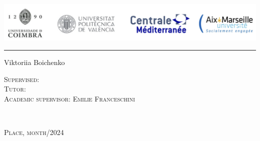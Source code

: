 \documentclass[11pt]{report}
\begin{document}

\thispagestyle{empty}
\begin{minipage}{0.96\linewidth}
\includegraphics[width=\linewidth]{figures/universities.png}
\end{minipage}
\vspace{20pt}
\hrule
\vspace{5pt}

\begin{center}
\vfill
{

\LARGE{}

\vspace{0.5cm}
\Large
{}}   


\vfill
 
\Large{Viktoriia Boichenko}
 
\vfill

\LARGE{}

\LARGE{}

\Large
{}

\end{center}

\vfill

\begin{minipage}[t]{0.5\linewidth}
    \textsc{Supervised:} \medskip\\
    \textsc{Tutor:} \medskip\\
    \textsc{Academic supervisor: Emilie Franceschini} \medskip\\
\end{minipage}
\begin{minipage}[t]{0.5\linewidth}
\end{minipage}

\vfill

\begin{minipage}[t]{0.5\linewidth}
    \textsc{} \medskip\\
\end{minipage}
\begin{minipage}[t]{0.5\linewidth}
    \large\textsc{Place, month/2024}\medskip\\
\end{minipage}
\end{document}
